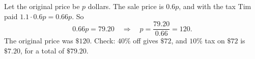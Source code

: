 Let the original price be $p$ dollars. The sale price is $0.6p$, and with the tax Tim paid $1.1\cdot0.6p=0.66p$. So
\[
0.66p=79.20\quad\Longrightarrow\quad p=\dfrac{79.20}{0.66}=120 .
\]
The original price was $\boxed{\$120}$. Check: $40\%$ off gives $\$72$, and $10\%$ tax on $\$72$ is $\$7.20$, for a total of $\$79.20$.
